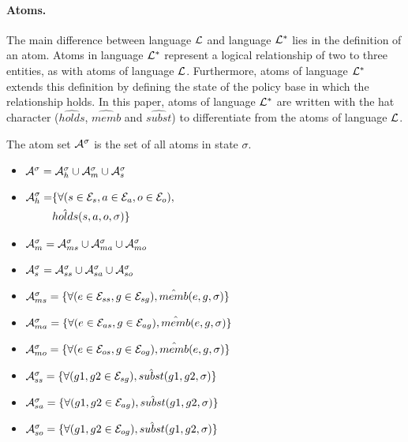 \documentclass[11pt, twocolumn]{article}
\begin{document}
        \paragraph{Atoms.}

          The main difference between language ${\cal L}$ and language
          ${\cal L}^{*}$ lies in the definition of an atom. Atoms in language
          ${\cal L}^{*}$ represent a logical relationship of two to three
          entities, as with atoms of language ${\cal L}$. Furthermore, atoms of
          language ${\cal L}^{*}$ extends this definition by defining the
          state of the policy base in which the relationship holds. In this
          paper, atoms of language ${\cal L}^{*}$ are written with the
          hat character ($\hat{holds}$, $\hat{memb}$ and $\hat{subst}$) to
          differentiate from the atoms of language ${\cal L}$.

          The atom set ${\cal A}^{\sigma}$ is the set of all atoms in state
          $\sigma$.

          \begin{itemize}
            \item
              ${\cal A}^{\sigma} = {\cal A}^{\sigma}_{h} \cup {\cal A}^{\sigma}_{m} \cup {\cal A}^{\sigma}_{s}$
            \item
              \begin{math}
                \begin{aligned}[t]
                  {\cal A}^{\sigma}_{h} =&\{\forall (s \in {\cal E}_{s}, a \in {\cal E}_{a}, o \in {\cal E}_{o}),\\
                  &\hat{holds}(s, a, o, \sigma) \}
                \end{aligned}
              \end{math}
            \item
              ${\cal A}^{\sigma}_{m} = {\cal A}^{\sigma}_{ms} \cup {\cal A}^{\sigma}_{ma} \cup {\cal A}^{\sigma}_{mo}$
            \item
              ${\cal A}^{\sigma}_{s} = {\cal A}^{\sigma}_{ss} \cup {\cal A}^{\sigma}_{sa} \cup {\cal A}^{\sigma}_{so}$
            \item
              ${\cal A}^{\sigma}_{ms} = \{\forall (e \in {\cal E}_{ss}, g \in {\cal E}_{sg}), \hat{memb}(e, g, \sigma)\}$
            \item
              ${\cal A}^{\sigma}_{ma} = \{\forall (e \in {\cal E}_{as}, g \in {\cal E}_{ag}), \hat{memb}(e, g, \sigma)\}$
            \item
              ${\cal A}^{\sigma}_{mo} = \{\forall (e \in {\cal E}_{os}, g \in {\cal E}_{og}), \hat{memb}(e, g, \sigma)\}$
            \item
              ${\cal A}^{\sigma}_{ss} = \{\forall (g1, g2 \in {\cal E}_{sg}), \hat{subst}(g1, g2, \sigma)\}$
            \item
              ${\cal A}^{\sigma}_{sa} = \{\forall (g1, g2 \in {\cal E}_{ag}), \hat{subst}(g1, g2, \sigma)\}$
            \item
              ${\cal A}^{\sigma}_{so} = \{\forall (g1, g2 \in {\cal E}_{og}), \hat{subst}(g1, g2, \sigma)\}$
          \end{itemize}
\end{document}
